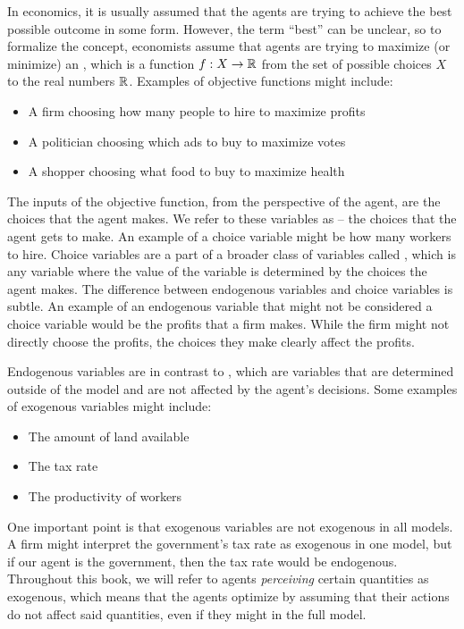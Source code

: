 In economics, it is usually assumed that the agents are trying to achieve the best possible outcome in some form. However, the term ``best'' can be unclear, so to formalize the concept, economists assume that agents are trying to maximize (or minimize) an , which is a function $f: X \to \mathbb{R}$ from the set of possible choices $X$ to the real numbers $\mathbb{R}$. Examples of objective functions might include:
\begin{itemize}
    \item A firm choosing how many people to hire to maximize profits
    \item A politician choosing which ads to buy to maximize votes
    \item A shopper choosing what food to buy to maximize health
\end{itemize}

The inputs of the objective function, from the perspective of the agent, are the choices that the agent makes. We refer to these variables as  -- the choices that the agent gets to make. An example of a choice variable might be how many workers to hire. Choice variables are a part of a broader class of variables called , which is any variable where the value of the variable is determined by the choices the agent makes. The difference between endogenous variables and choice variables is subtle. An example of an endogenous variable that might not be considered a choice variable would be the profits that a firm makes. While the firm might not directly choose the profits, the choices they make clearly affect the profits.

Endogenous variables are in contrast to , which are variables that are determined outside of the model and are not affected by the agent's decisions. Some examples of exogenous variables might include:
\begin{itemize}
    \item The amount of land available
    \item The tax rate
    \item The productivity of workers
\end{itemize}
One important point is that exogenous variables are not exogenous in all models. A firm might interpret the government's tax rate as exogenous in one model, but if our agent is the government, then the tax rate would be endogenous. Throughout this book, we will refer to agents \textit{perceiving} certain quantities as exogenous, which means that the agents optimize by assuming that their actions do not affect said quantities, even if they might in the full model. 

